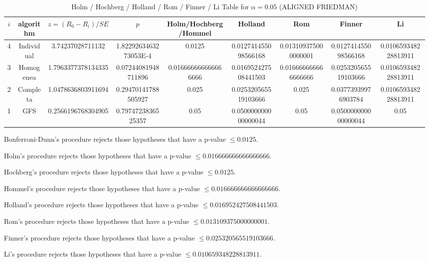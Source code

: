 \documentclass[a4paper,10pt]{article}
\begin{document}
\begin{landscape}
\begin{table}[!htp]
\centering\scriptsize
\caption{Holm / Hochberg / Holland / Rom / Finner / Li Table for $\alpha=0.05$ (ALIGNED FRIEDMAN)}
\begin{tabular}{ccccccccc}
$i$&algorithm&$z=(R_0 - R_i)/SE$&$p$&Holm/Hochberg/Hommel&Holland&Rom&Finner&Li\\
\hline
4&Individual&3.74237028711132&1.8229263463273053E-4&0.0125&0.012741455098566168&0.013109375000000001&0.012741455098566168&0.010659348228813911\\
3&Homogenea&1.7963377378134335&0.07244081948711896&0.016666666666666666&0.016952427508441503&0.016666666666666666&0.025320565519103666&0.010659348228813911\\
2&Completa&1.0478636803911694&0.29470141788505927&0.025&0.025320565519103666&0.025&0.03773939976903784&0.010659348228813911\\
1&GFS&0.2566196768304905&0.7974723836525357&0.05&0.050000000000000044&0.05&0.050000000000000044&0.05\\
\hline
\end{tabular}
\end{table}
Bonferroni-Dunn's procedure rejects those hypotheses that have a p-value $\le0.0125$.


Holm's procedure rejects those hypotheses that have a p-value $\le0.016666666666666666$.


Hochberg's procedure rejects those hypotheses that have a p-value $\le0.0125$.


Hommel's procedure rejects those hypotheses that have a p-value $\le0.016666666666666666$.


Holland's procedure rejects those hypotheses that have a p-value $\le0.016952427508441503$.


Rom's procedure rejects those hypotheses that have a p-value $\le0.013109375000000001$.


Finner's procedure rejects those hypotheses that have a p-value $\le0.025320565519103666$.


Li's procedure rejects those hypotheses that have a p-value $\le0.010659348228813911$.



\newpage


\end{landscape}
\end{document}
